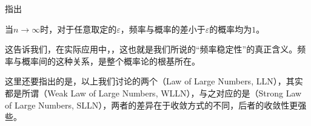 指出
\begin{center}
    当$n\to\infty$时，对于任意取定的$\varepsilon$，频率与概率的差小于$\varepsilon$的概率均为$1$。
\end{center}

这告诉我们，在实际应用中，，这也就是我们所说的“频率稳定性”的真正含义。频率与概率间的这种关系，是整个概率论的根基所在。

这里还要指出的是，以上我们讨论的两个（Law of Large Numbers, LLN），其实都是所谓（Weak Law of Large Numbers, WLLN），与之对应的是（Strong Law of Large Numbers, SLLN），两者的差异在于收敛方式的不同，后者的收敛性更强些。